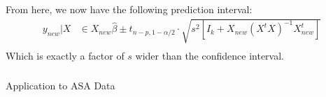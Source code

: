 \begin{frame}[fragile] \frametitle{}

From here, we now have the following prediction interval:
\begin{align*}
y_{new} | X &\in X_{new} \widehat{\beta} \pm t_{n-p,1-\alpha/2} \cdot
\sqrt{s^2 \left[ I_k + X_{new} (X^t X)^{-1} X_{new}^t \right]} \\
\end{align*}
Which is exactly a factor of $s$ wider than the confidence interval.


\end{frame}

\begin{frame}[fragile] \frametitle{}

\begin{flushright}
{\color{yaleblue}\sc\fontsize{1cm}{0cm}\selectfont Application to ASA Data}
\end{flushright}

\end{frame}













